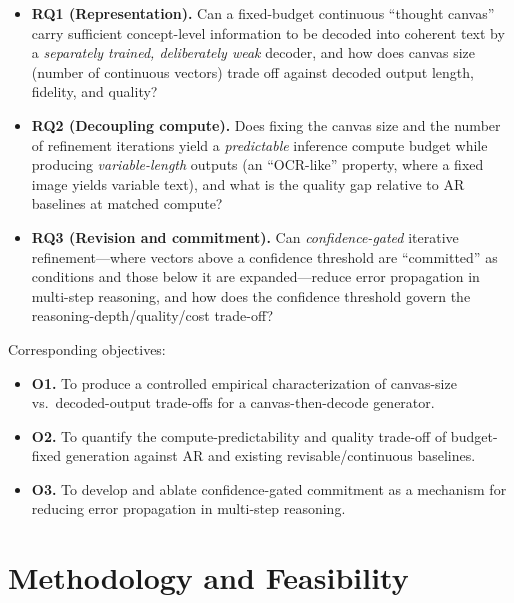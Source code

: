 \documentclass[11pt,a4paper]{article}
\begin{document}
\begin{itemize}[leftmargin=1.4em]
\item \textbf{RQ1 (Representation).} Can a fixed-budget continuous ``thought canvas'' carry sufficient concept-level information to be decoded into coherent text by a \emph{separately trained, deliberately weak} decoder, and how does canvas size (number of continuous vectors) trade off against decoded output length, fidelity, and quality?
\item \textbf{RQ2 (Decoupling compute).} Does fixing the canvas size and the number of refinement iterations yield a \emph{predictable} inference compute budget while producing \emph{variable-length} outputs (an ``OCR-like'' property, where a fixed image yields variable text), and what is the quality gap relative to AR baselines at matched compute?
\item \textbf{RQ3 (Revision and commitment).} Can \emph{confidence-gated} iterative refinement---where vectors above a confidence threshold are ``committed'' as conditions and those below it are expanded---reduce error propagation in multi-step reasoning, and how does the confidence threshold govern the reasoning-depth/quality/cost trade-off?
\end{itemize}

Corresponding objectives:
\begin{itemize}[leftmargin=1.4em]
\item \textbf{O1.} To produce a controlled empirical characterization of canvas-size vs.\ decoded-output trade-offs for a canvas-then-decode generator.
\item \textbf{O2.} To quantify the compute-predictability and quality trade-off of budget-fixed generation against AR and existing revisable/continuous baselines.
\item \textbf{O3.} To develop and ablate confidence-gated commitment as a mechanism for reducing error propagation in multi-step reasoning.
\end{itemize}

\section{Methodology and Feasibility}
\end{document}
